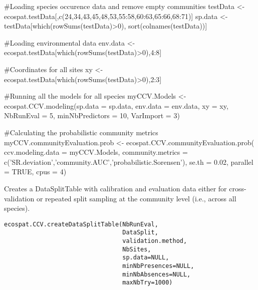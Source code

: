 \documentclass[a4paper]{book}
\begin{document}
\begin{Examples}
\begin{ExampleCode}
#Loading species occurence data and remove empty communities
testData <- ecospat.testData[,c(24,34,43,45,48,53,55:58,60:63,65:66,68:71)]
sp.data <- testData[which(rowSums(testData)>0), sort(colnames(testData))]

#Loading environmental data
env.data <- ecospat.testData[which(rowSums(testData)>0),4:8]

#Coordinates for all sites
xy <- ecospat.testData[which(rowSums(testData)>0),2:3]

#Running all the models for all species
myCCV.Models <- ecospat.CCV.modeling(sp.data = sp.data,
                                     env.data = env.data,
                                     xy = xy,
                                     NbRunEval = 5,
                                     minNbPredictors = 10,
                                     VarImport = 3)
                                     
#Calculating the probabilistic community metrics
myCCV.communityEvaluation.prob <- ecospat.CCV.communityEvaluation.prob(
      ccv.modeling.data = myCCV.Models,
      community.metrics = c('SR.deviation','community.AUC','probabilistic.Sorensen'),
      se.th = 0.02, 
      parallel = TRUE,
      cpus = 4)
\end{ExampleCode}
\end{Examples}
%
\begin{Description}\relax
Creates a DataSplitTable with calibration and evaluation data either for cross-validation or repeated split sampling at the community level (i.e., across all species).

\end{Description}
%
\begin{Usage}
\begin{verbatim}
ecospat.CCV.createDataSplitTable(NbRunEval, 
                                 DataSplit,
                                 validation.method,
                                 NbSites,
                                 sp.data=NULL,
                                 minNbPresences=NULL,
                                 minNbAbsences=NULL,
                                 maxNbTry=1000)
\end{verbatim}
\end{Usage}
\end{document}
